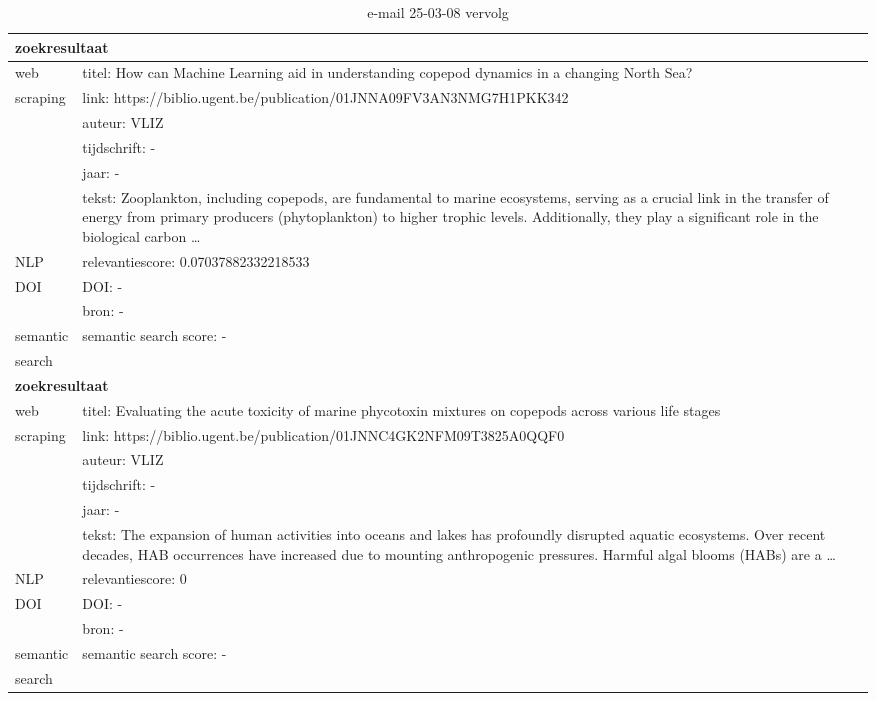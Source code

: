 \begin{table}[h!]
    \caption{e-mail 25-03-08 vervolg}
    \centering
    \begin{tabularx}{\textwidth}{|p{4cm}|X|} 
        \hline
        \multicolumn{2}{|X|}{\textbf{zoekresultaat}} \\
        \hline
        web &titel: How can Machine Learning aid in understanding copepod dynamics in a changing North Sea?\\
        scraping&link: https://biblio.ugent.be/publication/01JNNA09FV3AN3NMG7H1PKK342\\
        &auteur: VLIZ\\
        &tijdschrift: -\\
        &jaar: -\\
        &tekst: Zooplankton, including copepods, are fundamental to marine ecosystems, serving as a crucial link in the transfer of energy from primary producers (phytoplankton) to higher trophic levels. Additionally, they play a significant role in the biological carbon …\\
        \hline
        NLP&relevantiescore: 0.07037882332218533\\
        \hline
        DOI&DOI: -\\
        &bron: -\\
        \hline
        semantic&semantic search score: -\\
        search&\\
        \hline
        \multicolumn{2}{|X|}{\textbf{zoekresultaat}} \\
        \hline
        web &titel: Evaluating the acute toxicity of marine phycotoxin mixtures on copepods across various life stages\\
        scraping&link: https://biblio.ugent.be/publication/01JNNC4GK2NFM09T3825A0QQF0\\
        &auteur: VLIZ\\
        &tijdschrift: -\\
        &jaar: -\\
        &tekst: The expansion of human activities into oceans and lakes has profoundly disrupted aquatic ecosystems. Over recent decades, HAB occurrences have increased due to mounting anthropogenic pressures. Harmful algal blooms (HABs) are a …\\
        \hline
        NLP&relevantiescore: 0\\
        \hline
        DOI&DOI: -\\
        &bron: -\\
        \hline
        semantic&semantic search score: -\\
        search&\\
        \hline
    \end{tabularx}
    \label{table:email20250308vervolg}
\end{table}
